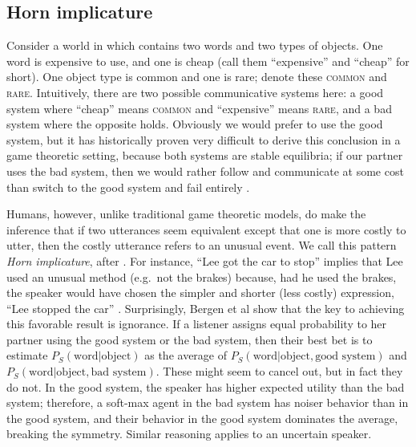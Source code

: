 \documentclass{article} %
\newcommand{\word}{\text{word}}
\newcommand{\obj}{\text{object}}
\begin{document}
%
%

\subsection{Horn implicature}

\label{sec:horn-implicature}

Consider a world in which contains two words and two types of
objects. One word is expensive to use, and one is cheap (call them
``expensive'' and ``cheap'' for short). One object type is common and
one is rare; denote these \textsc{common} and
\textsc{rare}. Intuitively, there are two possible communicative
systems here: a good system where ``cheap'' means \textsc{common} and
``expensive'' means \textsc{rare}, and a bad system where the opposite
holds. Obviously we would prefer to use the good system, but it has
historically proven very difficult to derive this conclusion in a game
theoretic setting, because both systems are stable equilibria; if our
partner uses the bad system, then we would rather follow and
communicate at some cost than switch to the good system and fail
entirely \cite{bergen2012}.

Humans, however, unlike traditional game theoretic models, do make the
inference that if two utterances seem equivalent except that one is
more costly to utter, then the costly utterance refers to an unusual
event. We call this pattern \textit{Horn implicature}, after
\cite{horn1984}. For instance, ``Lee got the car to stop'' implies
that Lee used an unusual method (e.g.~not the brakes) because, had he
used the brakes, the speaker would have chosen the simpler and shorter
(less costly) expression, ``Lee stopped the car''
\cite{horn1984}. Surprisingly, Bergen et al \cite{bergen2012} show
that the key to achieving this favorable result is ignorance. If a
listener assigns equal probability to her partner using the good
system or the bad system, then their best bet is to estimate
$P_S(\word | \obj)$ as the average of $P_S(\word | \obj, \text{good
  system})$ and $P_S(\word | \obj, \text{bad system})$. These might
seem to cancel out, but in fact they do not. In the good system, the
speaker has higher expected utility than the bad system; therefore, a
soft-max agent in the bad system has noiser behavior than in the good
system, and their behavior in the good system dominates the average,
breaking the symmetry. Similar reasoning applies to an uncertain
speaker.
\end{document}
